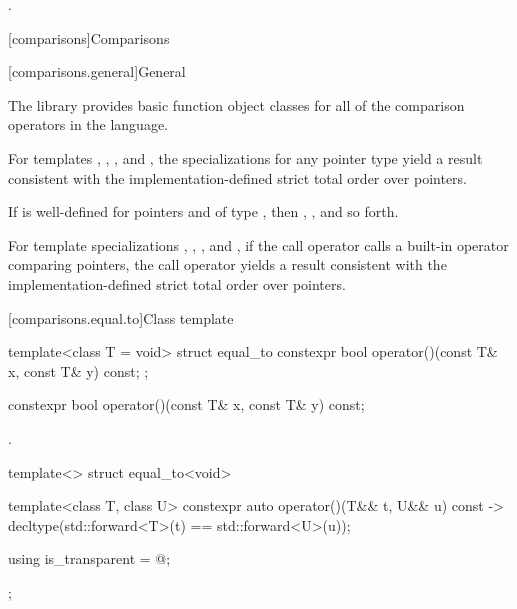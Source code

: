 \begin{itemdescr}
\pnum
\returns
{}.
\end{itemdescr}


[comparisons]{Comparisons}

[comparisons.general]{General}

\pnum
The library provides basic function object classes for all of the comparison
operators in the language.

\pnum
For templates , , , and
, the specializations for any pointer type
yield a result consistent with the
implementation-defined strict total order over pointers.
\begin{note}
If  is well-defined
for pointers  and  of type ,
then ,
, and so forth.
\end{note}
For template specializations , ,
, and ,
if the call operator calls a built-in operator comparing pointers,
the call operator yields a result consistent
with the implementation-defined strict total order over pointers.

[comparisons.equal.to]{Class template }

%
\begin{itemdecl}
template<class T = void> struct equal_to {
  constexpr bool operator()(const T& x, const T& y) const;
};
\end{itemdecl}

%
\begin{itemdecl}
constexpr bool operator()(const T& x, const T& y) const;
\end{itemdecl}

\begin{itemdescr}
\pnum
\returns
{}.
\end{itemdescr}

%
\begin{itemdecl}
template<> struct equal_to<void> {
  template<class T, class U> constexpr auto operator()(T&& t, U&& u) const
    -> decltype(std::forward<T>(t) == std::forward<U>(u));

  using is_transparent = @\unspec@;
};
\end{itemdecl}

